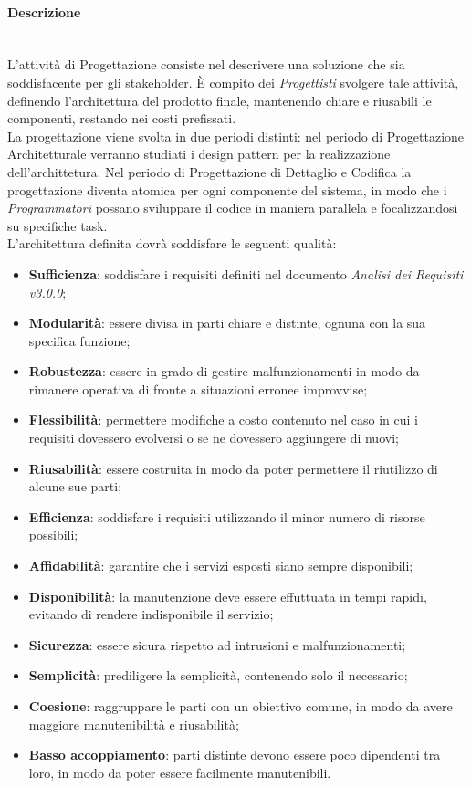 \paragraph{Descrizione}
\label{Progettazione_Scopo} \-\\
L'attività di Progettazione consiste nel descrivere una soluzione che sia soddisfacente per gli stakeholder\glossario. È compito dei \textit{Progettisti} svolgere tale attività, definendo l'architettura del prodotto finale, mantenendo chiare e riusabili le componenti, restando nei costi prefissati.\\
La progettazione viene svolta in due periodi distinti: nel periodo di Progettazione Architetturale verranno studiati i design pattern per la realizzazione dell'archittetura. Nel periodo di  Progettazione di Dettaglio e Codifica la progettazione diventa atomica per ogni componente del sistema, in modo che i \textit{Programmatori} possano sviluppare il codice in maniera parallela e focalizzandosi su specifiche task. \\
L’architettura definita dovrà soddisfare le seguenti qualità:
\begin{itemize}
	\item \textbf{Sufficienza}: soddisfare i requisiti definiti nel documento \textit{Analisi dei Requisiti v3.0.0};
	\item \textbf{Modularità}: essere divisa in parti chiare e distinte, ognuna con la sua specifica funzione;
	\item \textbf{Robustezza}: essere in grado di gestire malfunzionamenti in modo da
	rimanere operativa di fronte a situazioni erronee improvvise;
	\item \textbf{Flessibilità}: permettere modifiche a costo contenuto nel caso in cui i
	requisiti dovessero evolversi o se ne dovessero aggiungere di nuovi;
	\item \textbf{Riusabilità}: essere costruita in modo da poter permettere il riutilizzo
	di alcune sue parti;
	\item \textbf{Efficienza}: soddisfare i requisiti utilizzando il minor numero di risorse possibili;
	\item \textbf{Affidabilità}: garantire che i servizi esposti siano sempre disponibili;
	\item \textbf{Disponibilità}: la manutenzione deve essere effuttuata in tempi rapidi, evitando di rendere indisponibile il servizio;
	\item \textbf{Sicurezza}: essere sicura rispetto ad intrusioni e malfunzionamenti;
	\item \textbf{Semplicità}: prediligere la semplicità, contenendo solo il necessario;
	\item \textbf{Coesione}: raggruppare le parti con un obiettivo comune, in modo da avere maggiore manutenibilità e riusabilità;
	\item \textbf{Basso accoppiamento}: parti distinte devono essere poco dipendenti tra loro, in modo da poter essere facilmente manutenibili.
\end{itemize}

